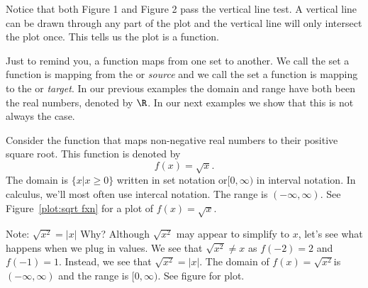 \documentclass{ximera}
\begin{document}
Notice that both Figure 1 and Figure 2 pass the vertical line test.  A vertical line can be drawn through any part of the plot and the vertical line will only intersect the plot once.  This tells us the plot is a function.

Just to remind you, a function maps from one set to another. We call
the set a function is mapping from the 
or \textit{source} and we call the set a function is mapping to the
 or \textit{target}.  In our previous
examples the domain and range have both been the real numbers, denoted
by $\R$. In our next examples we show that this is not always the
case.


\begin{example}
Consider the function that maps non-negative real numbers to their positive square root. This function is denoted by 
\[
f(x) = \sqrt{x}.
\]
The domain is $\{x\left| x\ge 0\}$ written in set notation or$[0,\infty )$ in interval notation.  In calculus, we'll most often use intercal notation.  The range is $(-\infty,\infty)$.
See Figure~\ref{plot:sqrt fxn} for a plot of $f(x) = \sqrt{x}$.
\end{example}

\begin{image}
\end{image}


Note: $\sqrt{x^2} = |x|$  Why?  Although $\sqrt{x^2}$ may appear to simplify to $x$, let's see what happens when we plug in values.
We see that $\sqrt{x^2}\ne x$ as $f(-2)=2$ and $f(-1)=1$.  Instead, we see that $\sqrt{x^2} = |x|$.  The domain of $f(x)=\sqrt{x^2}$is $(-\infty,\infty)$ and the range is $[0,\infty)$.  See figure for plot.
\end{document}
